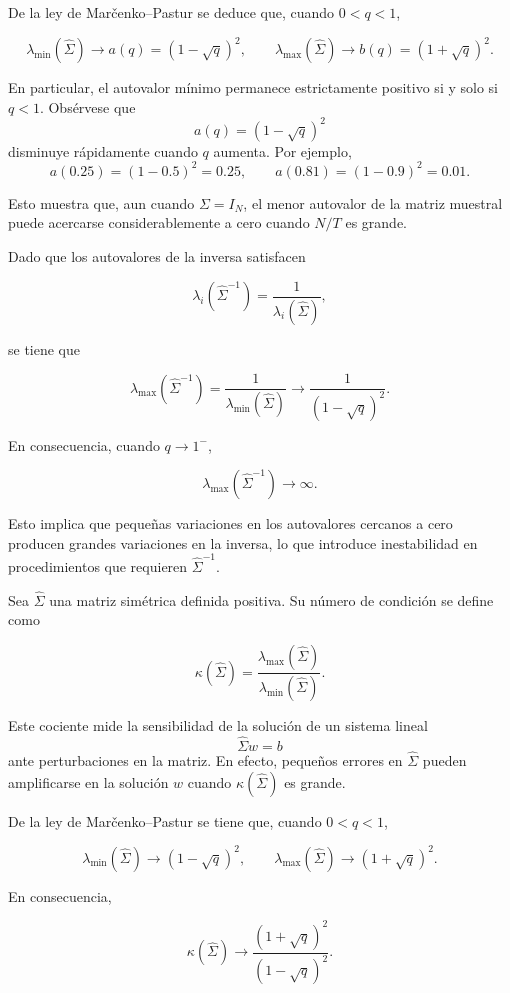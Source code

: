 \documentclass[letterpaper,12pt,oneside]{book}
\begin{document}
De la ley de Marčenko--Pastur se deduce que, cuando $0<q<1$,

\[
\lambda_{\min}(\widehat{\Sigma}) \longrightarrow a(q) = (1-\sqrt{q})^2,
\qquad
\lambda_{\max}(\widehat{\Sigma}) \longrightarrow b(q) = (1+\sqrt{q})^2.
\]

En particular, el autovalor mínimo permanece estrictamente positivo si y solo si $q<1$.
Obsérvese que
\[
a(q) = (1-\sqrt{q})^2
\]
disminuye rápidamente cuando $q$ aumenta. Por ejemplo,
\[
a(0.25) = (1-0.5)^2 = 0.25,
\qquad
a(0.81) = (1-0.9)^2 = 0.01.
\]

Esto muestra que, aun cuando $\Sigma = I_N$, el menor autovalor de la matriz muestral puede acercarse considerablemente a cero cuando $N/T$ es grande.

Dado que los autovalores de la inversa satisfacen

\[
\lambda_i(\widehat{\Sigma}^{-1})
=
\frac{1}{\lambda_i(\widehat{\Sigma})},
\]

se tiene que

\[
\lambda_{\max}(\widehat{\Sigma}^{-1})
=
\frac{1}{\lambda_{\min}(\widehat{\Sigma})}
\longrightarrow
\frac{1}{(1-\sqrt{q})^2}.
\]

En consecuencia, cuando $q \to 1^{-}$,

\[
\lambda_{\max}(\widehat{\Sigma}^{-1}) \to \infty.
\]

Esto implica que pequeñas variaciones en los autovalores cercanos a cero producen grandes variaciones en la inversa, lo que introduce inestabilidad en procedimientos que requieren $\widehat{\Sigma}^{-1}$.

Sea $\widehat{\Sigma}$ una matriz simétrica definida positiva.
Su número de condición se define como

\[
\kappa(\widehat{\Sigma})
=
\frac{\lambda_{\max}(\widehat{\Sigma})}
{\lambda_{\min}(\widehat{\Sigma})}.
\]

Este cociente mide la sensibilidad de la solución de un sistema lineal
\[
\widehat{\Sigma} w = b
\]
ante perturbaciones en la matriz. En efecto, pequeños errores en
$\widehat{\Sigma}$ pueden amplificarse en la solución $w$ cuando
$\kappa(\widehat{\Sigma})$ es grande.

De la ley de Marčenko--Pastur se tiene que, cuando $0<q<1$,

\[
\lambda_{\min}(\widehat{\Sigma}) \longrightarrow (1-\sqrt{q})^2,
\qquad
\lambda_{\max}(\widehat{\Sigma}) \longrightarrow (1+\sqrt{q})^2.
\]

En consecuencia,

\[
\kappa(\widehat{\Sigma})
\longrightarrow
\frac{(1+\sqrt{q})^2}{(1-\sqrt{q})^2}.
\]
\end{document}
